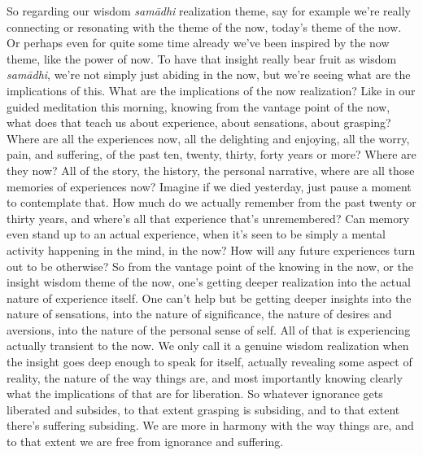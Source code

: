\documentclass[12pt,openany]{book}
\begin{document}
So regarding our wisdom \textit{samādhi} realization theme, say for example we’re really connecting or resonating with the theme of the now, today’s theme of the now. Or perhaps even for quite some time already we've been inspired by the now theme, like the power of now. To have that insight really bear fruit as wisdom \textit{samādhi}, we're not simply just abiding in the now, but we’re seeing what are the implications of this. What are the implications of the now realization? Like in our guided meditation this morning, knowing from the vantage point of the now, what does that teach us about experience, about sensations, about grasping? Where are all the experiences now, all the delighting and enjoying, all the worry, pain, and suffering, of the past ten, twenty, thirty, forty years or more? Where are they now? All of the story, the history, the personal narrative, where are all those memories of experiences now? Imagine if we died yesterday, just pause a moment to contemplate that. How much do we actually remember from the past twenty or thirty years, and where's all that experience that's unremembered? Can memory even stand up to an actual experience, when it’s seen to be simply a mental activity happening in the mind, in the now? How will any future experiences turn out to be otherwise? So from the vantage point of the knowing in the now, or the insight wisdom theme of the now, one’s getting deeper realization into the actual nature of experience itself. One can't help but be getting deeper insights into the nature of sensations, into the nature of significance, the nature of desires and aversions, into the nature of the personal sense of self. All of that is experiencing actually transient to the now. We only call it a genuine wisdom realization when the insight goes deep enough to speak for itself, actually revealing some aspect of reality, the nature of the way things are, and most importantly knowing clearly what the implications of that are for liberation. So whatever ignorance gets liberated and subsides, to that extent grasping is subsiding, and to that extent there’s suffering subsiding. We are more in harmony with the way things are, and to that extent we are free from ignorance and suffering. 
\end{document}
